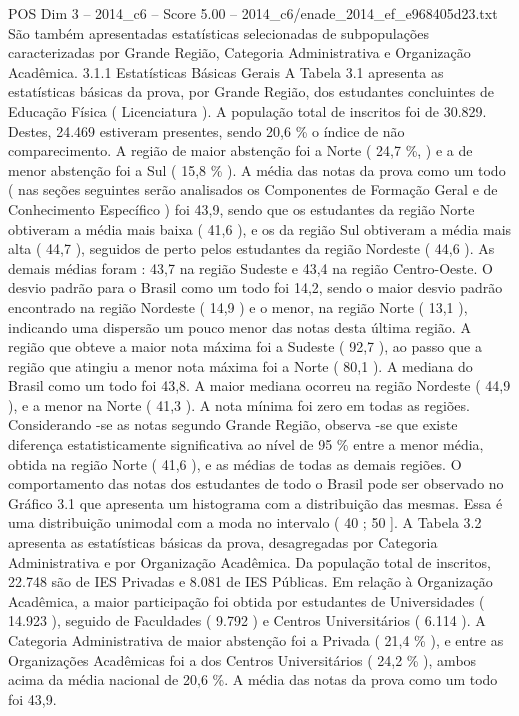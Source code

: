 \begin{textsample}{POS Dim 3 – 2014\_c6 – Score 5.00 – 2014\_c6/enade\_2014\_ef\_e968405d23.txt}
São também apresentadas estatísticas selecionadas de subpopulações caracterizadas por Grande Região, Categoria Administrativa e Organização Acadêmica. 3.1.1 Estatísticas Básicas Gerais A Tabela 3.1 apresenta as estatísticas básicas da prova, por Grande Região, dos estudantes concluintes de Educação Física ( Licenciatura ).
A população total de inscritos foi de 30.829.
Destes, 24.469 estiveram presentes, sendo 20,6 \% o índice de não comparecimento.
A região de maior abstenção foi a Norte ( 24,7 \%, ) e a de menor abstenção foi a Sul ( 15,8 \% ).
A média das notas da prova como um todo ( nas seções seguintes serão analisados os Componentes de Formação Geral e de Conhecimento Específico ) foi 43,9, sendo que os estudantes da região Norte obtiveram a média mais baixa ( 41,6 ), e os da região Sul obtiveram a média mais alta ( 44,7 ), seguidos de perto pelos estudantes da região Nordeste ( 44,6 ).
As demais médias foram : 43,7 na região Sudeste e 43,4 na região Centro-Oeste.
O desvio padrão para o Brasil como um todo foi 14,2, sendo o maior desvio padrão encontrado na região Nordeste ( 14,9 ) e o menor, na região Norte ( 13,1 ), indicando uma dispersão um pouco menor das notas desta última região.
A região que obteve a maior nota máxima foi a Sudeste ( 92,7 ), ao passo que a região que atingiu a menor nota máxima foi a Norte ( 80,1 ).
A mediana do Brasil como um todo foi 43,8.
A maior mediana ocorreu na região Nordeste ( 44,9 ), e a menor na Norte ( 41,3 ).
A nota mínima foi zero em todas as regiões.
Considerando -se as notas segundo Grande Região, observa -se que existe diferença estatisticamente significativa ao nível de 95 \% entre a menor média, obtida na região Norte ( 41,6 ), e as médias de todas as demais regiões.
O comportamento das notas dos estudantes de todo o Brasil pode ser observado no Gráfico 3.1 que apresenta um histograma com a distribuição das mesmas.
Essa é uma distribuição unimodal com a moda no intervalo ( 40 ; 50 ].
A Tabela 3.2 apresenta as estatísticas básicas da prova, desagregadas por Categoria Administrativa e por Organização Acadêmica.
Da população total de inscritos, 22.748 são de IES Privadas e 8.081 de IES Públicas.
Em relação à Organização Acadêmica, a maior participação foi obtida por estudantes de Universidades ( 14.923 ), seguido de Faculdades ( 9.792 ) e Centros Universitários ( 6.114 ).
A Categoria Administrativa de maior abstenção foi a Privada ( 21,4 \% ), e entre as Organizações Acadêmicas foi a dos Centros Universitários ( 24,2 \% ), ambos acima da média nacional de 20,6 \%.
A média das notas da prova como um todo foi 43,9.

\end{textsample}
